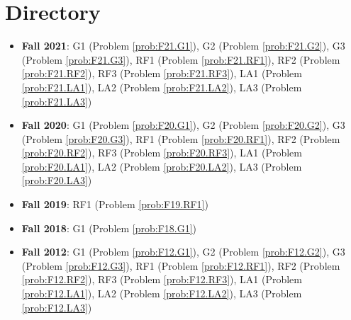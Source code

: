 \documentclass{article}
\theoremstyle{definition}
\begin{document}
\tableofcontents

\section{Directory}

\begin{itemize}
\item \textbf{Fall 2021}: 	G1 (Problem \ref{prob:F21.G1}), 
							G2 (Problem \ref{prob:F21.G2}), 
							G3 (Problem \ref{prob:F21.G3}),
							RF1 (Problem \ref{prob:F21.RF1}),
							RF2 (Problem \ref{prob:F21.RF2}),
							RF3 (Problem \ref{prob:F21.RF3}),
							LA1 (Problem \ref{prob:F21.LA1}),
							LA2 (Problem \ref{prob:F21.LA2}),
							LA3 (Problem \ref{prob:F21.LA3})
\item \textbf{Fall 2020}:  	G1 (Problem \ref{prob:F20.G1}), 
							G2 (Problem \ref{prob:F20.G2}), 
							G3 (Problem \ref{prob:F20.G3}),
							RF1 (Problem \ref{prob:F20.RF1}),
							RF2 (Problem \ref{prob:F20.RF2}),
							RF3 (Problem \ref{prob:F20.RF3}),
							LA1 (Problem \ref{prob:F20.LA1}),
							LA2 (Problem \ref{prob:F20.LA2}),
							LA3 (Problem \ref{prob:F20.LA3})
\item \textbf{Fall 2019}: RF1 (Problem \ref{prob:F19.RF1})
\item \textbf{Fall 2018}: G1 (Problem \ref{prob:F18.G1})
\item \textbf{Fall 2012}:  	G1 (Problem \ref{prob:F12.G1}), 
							G2 (Problem \ref{prob:F12.G2}), 
							G3 (Problem \ref{prob:F12.G3}),
							RF1 (Problem \ref{prob:F12.RF1}),
							RF2 (Problem \ref{prob:F12.RF2}),
							RF3 (Problem \ref{prob:F12.RF3}),
							LA1 (Problem \ref{prob:F12.LA1}),
							LA2 (Problem \ref{prob:F12.LA2}),
							LA3 (Problem \ref{prob:F12.LA3})
\end{itemize}
















\end{document}
